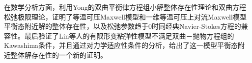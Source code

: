 \begin{cabstract}
在数学分析方面，利用Yong的双曲平衡律方程组小解整体存在性理论和双曲方程松弛极限理论，证明了等温可压Maxwell模型和一维等温可压上对流Maxwell模型平衡态附近解的整体存在性，以及松弛参数趋于$0$时同经典Navier-Stokes方程的兼容性。最后验证了Lin等人的有限形变粘弹性模型不满足双曲－抛物方程组的Kawashima条件，并且通过对力学适应性条件的分析，给出了这一模型平衡态附近整体解存在性的一个新的证明。



\end{cabstract}

